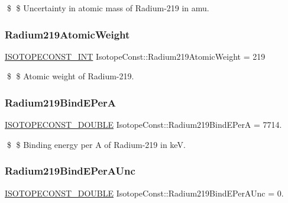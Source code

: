 \$ \$ Uncertainty in atomic mass of Radium-\/219 in amu. \mbox{\label{group___isotope_const-_radium-_ra219_ga3a59efbcb59ad7f2f25193294b0997e3}} 
\subsubsection{\texorpdfstring{Radium219\+Atomic\+Weight}{Radium219AtomicWeight}}
{\footnotesize\ttfamily \mbox{\hyperlink{group___isotope_const-_macros_ga5f18360b3e99483a35c32d789e62621c}{I\+S\+O\+T\+O\+P\+E\+C\+O\+N\+S\+T\+\_\+\+I\+NT}} Isotope\+Const\+::\+Radium219\+Atomic\+Weight = 219}

\$ \$ Atomic weight of Radium-\/219. \mbox{\label{group___isotope_const-_radium-_ra219_ga224ef396654f9ddd84879fcb758cb27f}} 
\subsubsection{\texorpdfstring{Radium219\+Bind\+E\+PerA}{Radium219BindEPerA}}
{\footnotesize\ttfamily \mbox{\hyperlink{group___isotope_const-_macros_ga8f45a7272ce02c0b4c65c44636ed719a}{I\+S\+O\+T\+O\+P\+E\+C\+O\+N\+S\+T\+\_\+\+D\+O\+U\+B\+LE}} Isotope\+Const\+::\+Radium219\+Bind\+E\+PerA = 7714.}

\$ \$ Binding energy per A of Radium-\/219 in keV. \mbox{\label{group___isotope_const-_radium-_ra219_ga9d7787b0d29010061930020253415b08}} 
\subsubsection{\texorpdfstring{Radium219\+Bind\+E\+Per\+A\+Unc}{Radium219BindEPerAUnc}}
{\footnotesize\ttfamily \mbox{\hyperlink{group___isotope_const-_macros_ga8f45a7272ce02c0b4c65c44636ed719a}{I\+S\+O\+T\+O\+P\+E\+C\+O\+N\+S\+T\+\_\+\+D\+O\+U\+B\+LE}} Isotope\+Const\+::\+Radium219\+Bind\+E\+Per\+A\+Unc = 0.}

